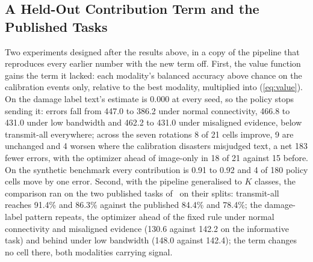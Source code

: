 \documentclass[conference,a4paper]{IEEEtran}
\newif\ifsubmission
\begin{document}
\ifsubmission
\subsection{A Held-Out Contribution Term and the Published Tasks}
\label{sec:pcterm}
Two experiments designed after the results above, in a copy of the pipeline that reproduces every earlier number with the new term off. First, the value function gains the term it lacked: each modality's balanced accuracy above chance on the calibration events only, relative to the best modality, multiplied into (\ref{eq:value}). On the damage label text's estimate is 0.000 at every seed, so the policy stops sending it: errors fall from 447.0 to 386.2 under normal connectivity, 466.8 to 431.0 under low bandwidth and 462.2 to 431.0 under misaligned evidence, below transmit-all everywhere; across the seven rotations 8 of 21 cells improve, 9 are unchanged and 4 worsen where the calibration disasters misjudged text, a net 183 fewer errors, with the optimizer ahead of image-only in 18 of 21 against 15 before. On the synthetic benchmark every contribution is 0.91 to 0.92 and 4 of 180 policy cells move by one error. Second, with the pipeline generalised to $K$ classes, the comparison ran on the two published tasks of~\cite{ofli2020} on their splits: transmit-all reaches 91.4\% and 86.3\% against the published 84.4\% and 78.4\%; the damage-label pattern repeats, the optimizer ahead of the fixed rule under normal connectivity and misaligned evidence (130.6 against 142.2 on the informative task) and behind under low bandwidth (148.0 against 142.4); the term changes no cell there, both modalities carrying signal.
\else
\end{document}
